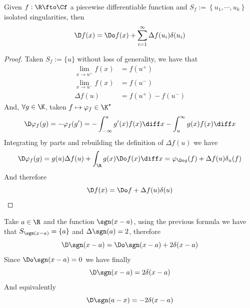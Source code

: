 \documentclass[../mmf.tex]{subfiles}
\begin{document}
\begin{thm}
	Given $f:\R\fto\Cf$ a piecewise differentiable function and $S_f:=\left\{ u_1,\cdots,u_k \right\}$ isolated singularities, then
	\begin{equation*}
		\D f(x)=\Do f(x)+\sum_{i=1}^\infty\Delta f(u_i)\delta(u_i)
	\end{equation*}
\end{thm}
\begin{proof}
	Taken $S_f:=\{u\}$ without loss of generality, we have that
	\begin{equation*}
		\begin{aligned}
			\lim_{x\to u^+}f(x)&=f(u^+)\\
			\lim_{x\to u^-}f(x)&=f(u^-)\\
			\Delta f(u)&=f(u^+)-f(u^-)
		\end{aligned}
	\end{equation*}
	And, $\forall g\in\K$, taken $f\mapsto\varphi_f\in\K^\star$
	\begin{equation*}
		\D\varphi_f(g)=-\varphi_f(g')=-\int_{-\infty}^{u}g'(x)f(x)\diff x-\int_{u}^{\infty}g(x)f(x)\diff x
	\end{equation*}
	Integrating by parts and rebuilding the definition of $\Delta f(u)$ we have
	\begin{equation*}
		\D\varphi_f(g)=g(u)\Delta f(u)+\int_{\R}^{}g(x)\Do f(x)\diff x=\varphi_{\Do g}(f)+\Delta f(u)\delta_u(f)
	\end{equation*}
	And therefore
	\begin{equation*}
		\D f(x)=\Do f+\Delta f(u)\delta(u)
	\end{equation*}
\end{proof}
\begin{eg}
	Take $a\in\R$ and the function $\sgn(x-a)$, using the previous formula we have that $S_{\sgn(x-a)}=\{a\}$ and $\Delta\sgn(a)=2$, therefore
	\begin{equation*}
		\D\sgn(x-a)=\Do\sgn(x-a)+2\delta(x-a)
	\end{equation*}
	Since $\Do\sgn(x-a)=0$ we have finally
	\begin{equation*}
		\D\sgn(x-a)=2\delta(x-a)
	\end{equation*}
	And equivalently
	\begin{equation*}
		\D\sgn(a-x)=-2\delta(x-a)
	\end{equation*}
\end{eg}
\end{document}
